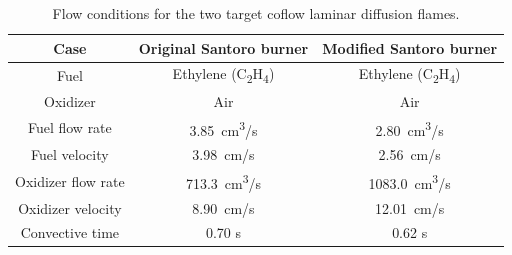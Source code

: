 \documentclass[12pt]{CHT-20}
\begin{document}
\begin{table}[H]
\centering
\captionsetup{justification=centering}
\caption{Flow conditions for the two target coflow laminar diffusion flames.}
 \begin{tabular}{ c  c  c } 
 \hline 
 Case & \textbf{Original Santoro burner} & \textbf{Modified Santoro burner} \\
 \hline \hline
 Fuel & Ethylene (C\textsubscript{2}H\textsubscript{4}) & Ethylene (C\textsubscript{2}H\textsubscript{4}) \\ %
 Oxidizer & Air & Air \\ %
 Fuel flow rate & 3.85~cm\textsuperscript{3}/s & 2.80~cm\textsuperscript{3}/s  \\ %
 Fuel velocity & 3.98~cm/s & 2.56~cm/s \\ %
 Oxidizer flow rate & 713.3~cm\textsuperscript{3}/s & 1083.0~cm\textsuperscript{3}/s \\ %
 Oxidizer velocity & 8.90~cm/s & 12.01~cm/s \\ 
 Convective time & 0.70 s & 0.62 s \\
 \hline
 \end{tabular}
\label{table:flames_flow_conditions}
\end{table}
\end{document}
